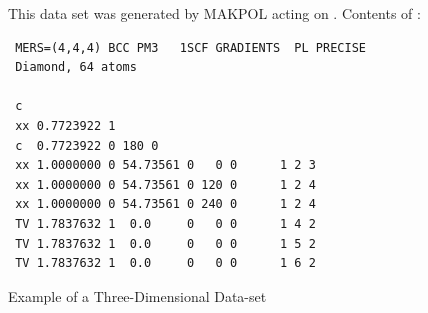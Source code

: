 \begin{figure}
This data set was generated by MAKPOL acting on .
Contents of :

\begin{verbatim}
 MERS=(4,4,4) BCC PM3   1SCF GRADIENTS  PL PRECISE
 Diamond, 64 atoms

 c
 xx 0.7723922 1
 c  0.7723922 0 180 0
 xx 1.0000000 0 54.73561 0   0 0      1 2 3
 xx 1.0000000 0 54.73561 0 120 0      1 2 4
 xx 1.0000000 0 54.73561 0 240 0      1 2 4
 TV 1.7837632 1  0.0     0   0 0      1 4 2
 TV 1.7837632 1  0.0     0   0 0      1 5 2
 TV 1.7837632 1  0.0     0   0 0      1 6 2
\end{verbatim}
\caption{\label{c64}Example of a Three-Dimensional Data-set}
\end{figure}

